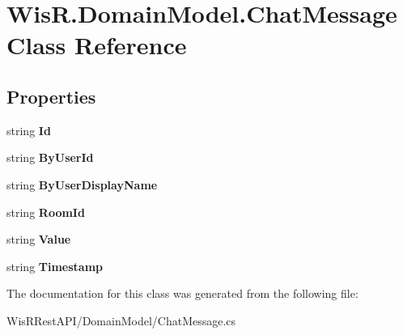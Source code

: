 \hypertarget{class_wis_r_1_1_domain_model_1_1_chat_message}{}\section{Wis\+R.\+Domain\+Model.\+Chat\+Message Class Reference}
\label{class_wis_r_1_1_domain_model_1_1_chat_message}
\subsection*{Properties}
\begin{DoxyCompactItemize}
\item 
\hypertarget{class_wis_r_1_1_domain_model_1_1_chat_message_ae46e6bd1821bd9bfdecbd0beb01eb2c0}{}string {\bfseries Id}\label{class_wis_r_1_1_domain_model_1_1_chat_message_ae46e6bd1821bd9bfdecbd0beb01eb2c0}

\item 
\hypertarget{class_wis_r_1_1_domain_model_1_1_chat_message_a7751c9c527124459abf4ebe2e8c79930}{}string {\bfseries By\+User\+Id}\label{class_wis_r_1_1_domain_model_1_1_chat_message_a7751c9c527124459abf4ebe2e8c79930}

\item 
\hypertarget{class_wis_r_1_1_domain_model_1_1_chat_message_a68eb097bff382ac1157f20d4badf428d}{}string {\bfseries By\+User\+Display\+Name}\label{class_wis_r_1_1_domain_model_1_1_chat_message_a68eb097bff382ac1157f20d4badf428d}

\item 
\hypertarget{class_wis_r_1_1_domain_model_1_1_chat_message_acccb3800e82fd51521878fbaf468ddfa}{}string {\bfseries Room\+Id}\label{class_wis_r_1_1_domain_model_1_1_chat_message_acccb3800e82fd51521878fbaf468ddfa}

\item 
\hypertarget{class_wis_r_1_1_domain_model_1_1_chat_message_a0f83cfe268a4b5ea843af4fd28b5d709}{}string {\bfseries Value}\label{class_wis_r_1_1_domain_model_1_1_chat_message_a0f83cfe268a4b5ea843af4fd28b5d709}

\item 
\hypertarget{class_wis_r_1_1_domain_model_1_1_chat_message_a648eebfcf492b2338632bac156a5f61c}{}string {\bfseries Timestamp}\label{class_wis_r_1_1_domain_model_1_1_chat_message_a648eebfcf492b2338632bac156a5f61c}

\end{DoxyCompactItemize}


The documentation for this class was generated from the following file\+:\begin{DoxyCompactItemize}
\item 
Wis\+R\+Rest\+A\+P\+I/\+Domain\+Model/Chat\+Message.\+cs\end{DoxyCompactItemize}
